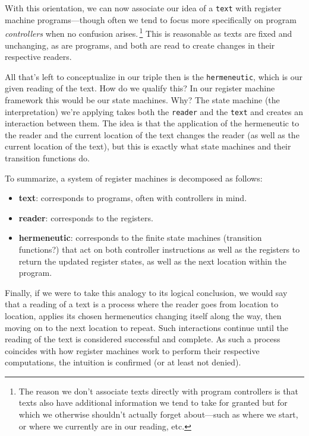 \documentclass[twoside]{article}
\newcommand{\strong}[1]{{\bfseries #1}}
\newcommand{\pdfnote}[1]{\,\footnote{#1}}
\begin{document}
With this orientation, we can now associate our idea of a \texttt{text} with register machine programs---though often
we tend to focus more specifically on program \emph{controllers} when no confusion arises.\pdfnote{The reason we don't
associate texts directly with program controllers is that texts also have additional information we tend to take for
granted but for which we otherwise shouldn't actually forget about---such as where we start, or where we currently are
in our reading, etc.} This is reasonable as texts are fixed and unchanging, as are programs, and both are read to create
changes in their respective readers.

All that's left to conceptualize in our triple then is the \texttt{hermeneutic}, which is our given reading of the text.
How do we qualify this? In our register machine framework this would be our state machines. Why? The state machine
(the interpretation) we're applying takes both the \texttt{reader} and the \texttt{text} and creates an interaction
between them. The idea is that the application of the hermeneutic to the reader and the current location of the text
changes the reader (as well as the current location of the text), but this is exactly what state machines and their
transition functions do.

To summarize, a system of register machines is decomposed as follows:

\begin{itemize}
\item \strong{text}: corresponds to programs, often with controllers in mind.
\item \strong{reader}: corresponds to the registers.
\item \strong{hermeneutic}: corresponds to the finite state machines (transition functions?) that act on both
	controller instructions as well as the registers to return the updated register states, as well as the next
	location within the program.
\end{itemize}

Finally, if we were to take this analogy to its logical conclusion, we would say that a reading of a text is a process
where the reader goes from location to location, applies its chosen hermeneutics changing itself along the way, then moving
on to the next location to repeat. Such interactions continue until the reading of the text is considered successful
and complete. As such a process coincides with how register machines work to perform their respective computations,
the intuition is confirmed (or at least not denied).
\end{document}
